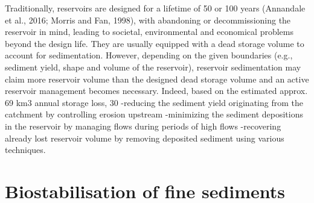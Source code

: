 Traditionally, reservoirs are designed for a lifetime of 50 or 100 years (Annandale et al., 2016; Morris and Fan, 1998), with abandoning or decommissioning the reservoir in mind, leading to societal, environmental and economical problems beyond the design life. They are usually equipped with a dead storage volume to account for sedimentation. However, depending on the given boundaries (e.g., sediment yield, shape and volume of the reservoir), reservoir sedimentation may claim more reservoir volume than the designed dead storage volume and an active reservoir management becomes necessary. Indeed, based on the estimated approx. 69 km3 annual storage loss, 30%
-reducing the sediment yield originating from the catchment by controlling erosion upstream
-minimizing the sediment depositions in the reservoir by managing flows during periods of high flows
-recovering already lost reservoir volume by removing deposited sediment using various techniques.
\section{Biostabilisation of fine sediments}
\label{sec:1}
